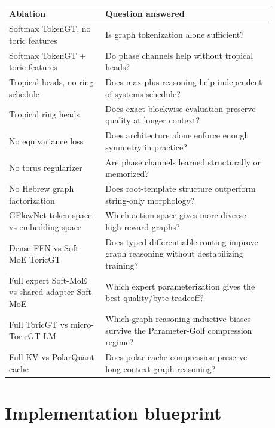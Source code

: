 \documentclass[11pt]{article}
\theoremstyle{definition}
\theoremstyle{plain}
\theoremstyle{remark}
\numberwithin{equation}{section}
\begin{document}
\begin{longtable}{p{0.32\linewidth}p{0.56\linewidth}}
\toprule
Ablation & Question answered \\
\midrule
\endhead
Softmax TokenGT, no toric features & Is graph tokenization alone sufficient? \\
Softmax TokenGT + toric features & Do phase channels help without tropical heads? \\
Tropical heads, no ring schedule & Does max-plus reasoning help independent of systems schedule? \\
Tropical ring heads & Does exact blockwise evaluation preserve quality at longer context? \\
No equivariance loss & Does architecture alone enforce enough symmetry in practice? \\
No torus regularizer & Are phase channels learned structurally or memorized? \\
No Hebrew graph factorization & Does root-template structure outperform string-only morphology? \\
GFlowNet token-space vs embedding-space & Which action space gives more diverse high-reward graphs? \\
Dense FFN vs Soft-MoE ToricGT & Does typed differentiable routing improve graph reasoning without destabilizing training? \\
Full expert Soft-MoE vs shared-adapter Soft-MoE & Which expert parameterization gives the best quality/byte tradeoff? \\
Full ToricGT vs micro-ToricGT LM & Which graph-reasoning inductive biases survive the Parameter-Golf compression regime? \\
Full KV vs PolarQuant cache & Does polar cache compression preserve long-context graph reasoning? \\
\bottomrule
\end{longtable}

\section{Implementation blueprint}
\end{document}
